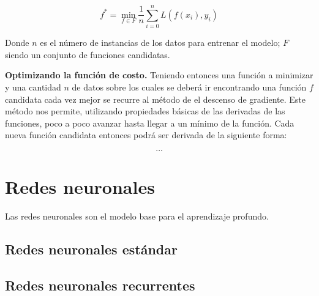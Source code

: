 $$f^* = \min_{f \in F} \frac{1}{n} \sum_{i = 0}^{n} L(f(x_i), y_i)$$

Donde $n$ es el número de instancias de los datos para entrenar el modelo; $F$ siendo un conjunto de funciones candidatas.

\textbf{Optimizando la función de costo.} Teniendo entonces una función a minimizar y una cantidad $n$ de datos sobre los cuales se deberá ir encontrando una función $f$ candidata cada vez mejor se recurre al método de el descenso de gradiente. Este método nos permite, utilizando propiedades básicas de las derivadas de las funciones, poco a poco avanzar hasta llegar a un mínimo de la función. Cada nueva función candidata entonces podrá ser derivada de la siguiente forma:

$$ \ldots $$

\section{Redes neuronales}

Las redes neuronales son el modelo base para el aprendizaje profundo.

\subsection{Redes neuronales estándar}

\subsection{Redes neuronales recurrentes}